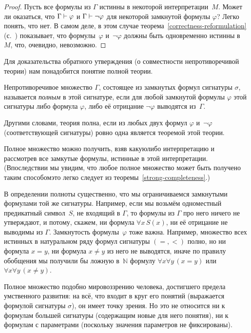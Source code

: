 \begin{proof}
Пусть все формулы из $\Gamma$ истинны в некоторой
интерпретации~$M$. Может ли оказаться, что $\Gamma\hm\vdash
\varphi$ и $\Gamma\hm\vdash\lnot\varphi$ для некоторой замкнутой
формулы $\varphi$? Легко понять, что нет. В самом деле, в этом
случае теорема~\ref{correctness-reformulation}
(с.~\pageref{correctness-reformulation}) показывает, что
формулы~$\varphi$ и~$\lnot\varphi$ должны быть одновременно
истинны в~$M$,
что, очевидно, невозможно.
\end{proof}

Для доказательства обратного утверждения (о совместности
не\-про\-ти\-во\-ре\-чи\-вой теории) нам понадобится понятие полной теории.

Непротиворечивое множество $\Gamma$, состоящее из замк\-ну\-тых
формул сигнатуры $\sigma$, называется \emph{полным} в этой
сигнатуре,%
если для любой замкнутой формулы $\varphi$ этой сигнатуры либо
формула $\varphi$, либо её отрицание $\lnot \varphi$ выводятся
из~$\Gamma$.

Другими словами, теория полна, если из любых двух формул
$\varphi$ и~$\lnot\varphi$ (соответствующей сигнатуры) ровно одна
является теоремой этой теории.

Полное множество можно получить, взяв какую\д либо интерпретацию
и рассмотрев все замкутые формулы, истинные в этой
интерпретации. (Впоследствии мы увидим, что любое полное
множество может быть получено таким способом\т это легко следует
из теоремы~\ref{strong-completeness}.)

В определении полноты существенно, что мы ограничиваемся замкнутыми
формулами той же сигнатуры. Например, если мы возьмём
одноместный предикатный символ~$S$, не входящий в $\Gamma$, то
формулы из $\Gamma$ про него ничего не утверждают, и потому,
скажем, ни формула $\forall x\, S(x)$, ни её отрицание не
выводимы из $\Gamma$. Замкнутость формулы~$\varphi$ тоже важна.
Например, множество всех истинных в натуральном ряду формул
сигнатуры $({=},{<})$ полно, но ни формула $x=y$, ни формула
$x\ne y$ из него не выводятся, иначе по правилу обобщения мы
получили бы ложную в~$\mathbb{N}$ формулу ${\forall x\forall y\,
(x=y)}$ или ${\forall x \forall y\, (x\ne y)}$.

Полное множество подобно мировоззрению
человека, достигшего предела умственного развития: на всё, что
входит в круг его понятий (выражается формулой сигнатуры
$\sigma$), он имеет точку зрения. Но это не относится ни к
формулам большей сигнатуры (содержащим новые для него понятия),
ни к формулам с параметрами (поскольку значения параметров не
фиксированы).

